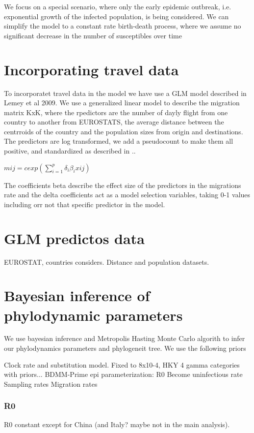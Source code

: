 We focus on a special scenario, where only the early epidemic outbreak, i.e. exponential growth of the infected population, is being considered. We can simplify the model to a constant rate birth-death process, where we assume no significant decrease in the number of susceptibles over time \cite{TanjaBonhoeffer2014}

\section{Incorporating travel data}

To incorporatet travel data in the model we have use a GLM model described in Lemey et al 2009. We use a generalized linear model to describe the migration matrix KxK, where the rpedictors are the number of dayly flight from one country to another from EUROSTATS, the average distance between the centrroids of the country and the population sizes from origin and destinations. The predictors are log transformed, we add a pseudocount to make them all positive, and standardized as described in ..

$mij = c exp(\sum_{i = 1}^p \delta_i \beta_i xij)$

The coefficients beta describe the effect size of the predictors in the migrations rate and the delta coefficients act as a model selection variables, taking 0-1 values including orr not that specific predictor in the model.


\section{GLM predictos data}

EUROSTAT, countries considers. Distance and population datasets.


\section{Bayesian inference of phylodynamic parameters}

We use bayesian inference and Metropolis Hasting Monte Carlo algorith to infer our phylodynamics parameters and phylogeneit tree. We use the following priors

Clock rate and substitution model. Fixed to 8x10-4, HKY 4 gamma categories with priors...
BDMM-Prime epi parameterization:
R0
Become uninfectious rate
Sampling rates
Migration rates


\subsubsection{R0}
R0 constant except for China (and Italy? maybe not in the main analysis).


